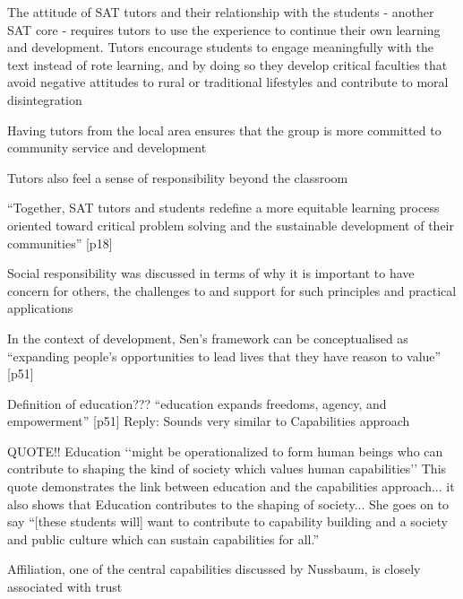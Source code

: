 The attitude of SAT tutors and their relationship with the students - another SAT core - requires tutors to use the experience to continue their own learning and development. Tutors encourage students to engage meaningfully with the text instead of rote learning, and by doing so they develop critical faculties that avoid negative attitudes to rural or traditional lifestyles and contribute to moral disintegration  \citep{Kwauk2016} %

Having tutors from the local area ensures that the group is more committed to community service and development \citep{Kwauk2016}

Tutors also feel a sense of responsibility beyond the classroom \citep{Kwauk2016}

“Together, SAT tutors and students redefine a more equitable learning process oriented toward critical problem solving and the sustainable development of their communities”  \citep{Kwauk2016}[p18]



Social responsibility was discussed in terms of why it is important to have concern for others, the challenges to and support for such principles and practical applications  \citep{Kwauk2016}










In the context of development, Sen's framework can be conceptualised as “expanding people's opportunities to lead lives that they have reason to value” [p51] \citep{Murphy-Graham2014}

Definition of education??? “education expands freedoms, agency, and empowerment” [p51] Reply: Sounds very similar to Capabilities approach  \citep{Murphy-Graham2014}

QUOTE!! Education ‘‘might be operationalized to form human beings who can contribute to shaping the kind of society which values human capabilities’’ \citep[][p392]{Walker2012}    This quote demonstrates the link between education and the capabilities approach... it also shows that Education contributes to the shaping of society...   She goes on to say “[these students will] want to contribute to capability building and a society and public culture which can sustain capabilities for all.” \citep[][p392]{Walker2012}


Affiliation, one of the central capabilities discussed by Nussbaum, is closely associated with trust \citep{Murphy-Graham2014}

